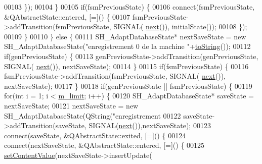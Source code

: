\begin{DoxyCode}
00103                     \});
00104                 \}
00105                 \textcolor{keywordflow}{if}(fsmPreviousState) \{
00106                     connect(fsmPreviousState, &QAbstractState::entered, [=]() \{
00107                         fsmPreviousState->addTransition(fsmPreviousState, SIGNAL(
      \hyperlink{classSimpleHotel_1_1SH__GenericStateMachine_a2de14d4920ae8c10b70c2d73fc2d4a93}{next}()), initialState());
00108                     \});
00109                 \}
00110             \} \textcolor{keywordflow}{else} \{
00111                 SH\_AdaptDatabaseState* nextSaveState = \textcolor{keyword}{new} SH\_AdaptDatabaseState(\textcolor{stringliteral}{"enregistrement 0 de la
       machine "}+\hyperlink{classSimpleHotel_1_1SH__GenericStateMachine_ad6dd1d0986c40684410ed94f1f610b12}{toString}());
00112                 \textcolor{keywordflow}{if}(genPreviousState) \{
00113                     genPreviousState->addTransition(genPreviousState, SIGNAL(
      \hyperlink{classSimpleHotel_1_1SH__GenericStateMachine_a2de14d4920ae8c10b70c2d73fc2d4a93}{next}()), nextSaveState);
00114                 \}
00115                 \textcolor{keywordflow}{if}(fsmPreviousState) \{
00116                     fsmPreviousState->addTransition(fsmPreviousState, SIGNAL(
      \hyperlink{classSimpleHotel_1_1SH__GenericStateMachine_a2de14d4920ae8c10b70c2d73fc2d4a93}{next}()), nextSaveState);
00117                 \}
00118                 \textcolor{keywordflow}{if}(genPreviousState || fsmPreviousState) \{
00119                     \textcolor{keywordflow}{for}(\textcolor{keywordtype}{int} i = 1; i < \hyperlink{classSimpleHotel_1_1SH__LoopingInOutStateMachine_ae5e496343aed89d7062e2478218f4e7d}{m\_limit}; i++) \{
00120                         SH\_AdaptDatabaseState* saveState = nextSaveState;
00121                         nextSaveState = \textcolor{keyword}{new} SH\_AdaptDatabaseState(QString(\textcolor{stringliteral}{"enregistrement %
00122                         saveState->addTransition(saveState, SIGNAL(\hyperlink{classSimpleHotel_1_1SH__GenericStateMachine_a2de14d4920ae8c10b70c2d73fc2d4a93}{next}()),nextSaveState);
00123                         connect(saveState, &QAbstractState::exited, [=]() \{
00124                             connect(nextSaveState, &QAbstractState::entered, [=]() \{
00125                                 \hyperlink{classSimpleHotel_1_1SH__InOutStateMachine_aaf92da452f6cf7cc57aa9e60f88322e4}{setContentValue}(nextSaveState->insertUpdate(
}
\end{DoxyCode}
